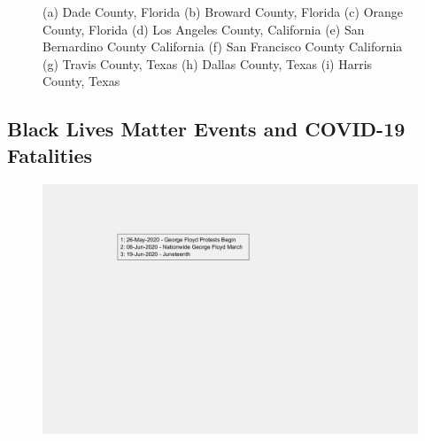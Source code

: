 \documentclass[]{article}
\begin{document}
\begin{figure}
	\caption{(a) Dade County, Florida (b) Broward County, Florida (c) Orange County, Florida (d) Los Angeles County, California (e) San Bernardino County California (f) San Francisco County California (g) Travis County, Texas (h) Dallas County, Texas (i) Harris County, Texas}
	\label{fig:foobar}
\end{figure}
\FloatBarrier
\vspace{5mm}

\subsection{Black Lives Matter Events and COVID-19 Fatalities}

\begin{figure}[!h]
	\includegraphics[width=\linewidth]{legends/BLM_legend.png}
	\caption{}
	\label{fig:legends/BLM_legendLabel}
\end{figure}
\end{document}
